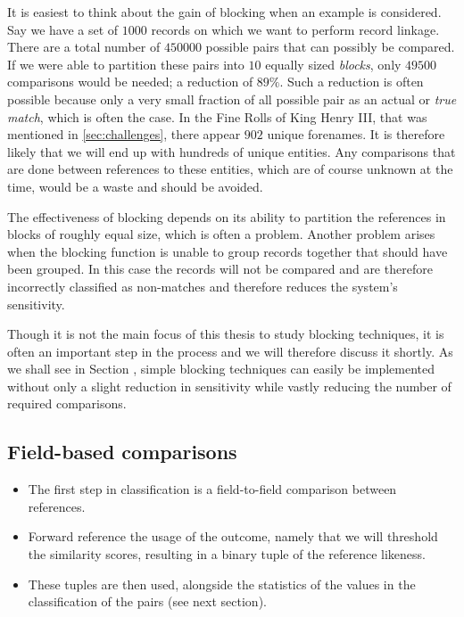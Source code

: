 It is easiest to think about the gain of blocking when an example is considered.
Say we have a set of $1000$ records on which we want to perform record linkage.
There are a total number of $450000$ possible pairs that can possibly be compared.
If we were able to partition these pairs into $10$ equally sized \emph{blocks}, only $49500$ comparisons would be needed; a reduction of $89\%$.
Such a reduction is often possible because only a very small fraction of all possible pair as an actual or \emph{true match}, which is often the case.
In the Fine Rolls of King Henry III, that was mentioned in \cref{sec:challenges}, there appear $902$ unique forenames.
It is therefore likely that we will end up with hundreds of unique entities.
Any comparisons that are done between references to these entities, which are of course unknown at the time, would be a waste and should be avoided.

The effectiveness of blocking depends on its ability to partition the references in blocks of roughly equal size, which is often a problem.
Another problem arises when the blocking function is unable to group records together that should have been grouped.
In this case the records will not be compared and are therefore incorrectly classified as non-matches and therefore reduces the system's sensitivity.

Though it is not the main focus of this thesis to study blocking techniques, it is often an important step in the process and we will therefore discuss it shortly.
As we shall see in Section , simple blocking techniques can easily be implemented without only a slight reduction in sensitivity while vastly reducing the number of required comparisons.





\subsection{Field-based comparisons}
\label{sec:field_comparisons}

\begin{itemize}
    \item The first step in classification is a field-to-field comparison between references.
    \item Forward reference the usage of the outcome, namely that we will threshold the similarity scores, resulting in a binary tuple of the reference likeness.
    \item These tuples are then used, alongside the statistics of the values in the classification of the pairs (see next section).
\end{itemize}

